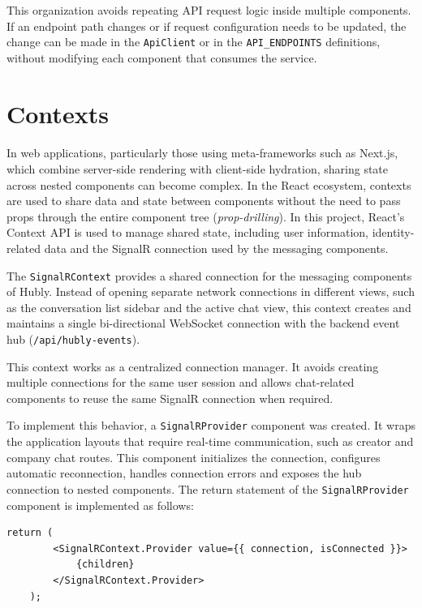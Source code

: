 This organization avoids repeating API request logic inside multiple components. If an endpoint path changes or if request configuration needs to be updated, the change can be made in the \texttt{ApiClient} or in the \texttt{API\_ENDPOINTS} definitions, without modifying each component that consumes the service.

\section{Contexts} \label{sec:contexts_web}
\paragraph{}In web applications, particularly those using meta-frameworks such as Next.js, which combine server-side rendering with client-side hydration, sharing state across nested components can become complex. In the React ecosystem, contexts are used to share data and state between components without the need to pass props through the entire component tree (\textit{prop-drilling}). In this project, React's Context API is used to manage shared state, including user information, identity-related data and the SignalR connection used by the messaging components.

The \texttt{SignalRContext} provides a shared connection for the messaging components of Hubly. Instead of opening separate network connections in different views, such as the conversation list sidebar and the active chat view, this context creates and maintains a single bi-directional WebSocket connection with the backend event hub (\texttt{/api/hubly-events}).

This context works as a centralized connection manager. It avoids creating multiple connections for the same user session and allows chat-related components to reuse the same SignalR connection when required.

To implement this behavior, a \texttt{SignalRProvider} component was created. It wraps the application layouts that require real-time communication, such as creator and company chat routes. This component initializes the connection, configures automatic reconnection, handles connection errors and exposes the hub connection to nested components. The return statement of the \texttt{SignalRProvider} component is implemented as follows:

\begin{lstlisting}[caption={SignalRProvider implementation snippet}, label={lst:signalr-provider}]
    return (
        <SignalRContext.Provider value={{ connection, isConnected }}>
            {children}
        </SignalRContext.Provider>
    );
\end{lstlisting}

